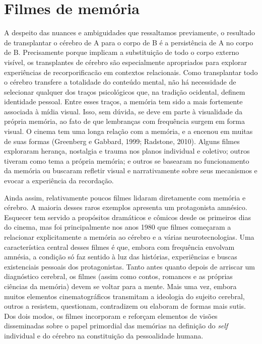 \section{Filmes de memória}

A despeito das nuances e ambiguidades que ressaltamos previamente, o
resultado de transplantar o cérebro de A para o corpo de B é a
persistência de A no corpo de B. Precisamente porque implicam a
substituição de todo o corpo externo visível, os transplantes de cérebro
são especialmente apropriados para explorar experiências de
recorporificacão em contextos relacionais. Como transplantar todo o
cérebro transfere a totalidade do conteúdo mental, não há necessidade de
selecionar qualquer dos traços psicológicos que, na tradição ocidental,
definem identidade pessoal. Entre esses traços, a memória tem sido a mais
fortemente associada à mídia visual. Isso, sem dúvida, se deve em parte
à visualidade da própria memória, ao fato de que lembranças com
frequência surgem em forma visual. O cinema tem uma longa relação com a
memória, e a encenou em muitas de suas formas (Greenberg e Gabbard,
1999; Radstone, 2010). Alguns filmes exploraram herança, nostalgia e
trauma nos planos individual e coletivo; outros tiveram como tema a
própria memória; e outros se basearam no funcionamento da memória ou
buscaram refletir visual e narrativamente sobre seus mecanismos e evocar
a experiência da recordação.

Ainda assim, relativamente poucos filmes lidaram diretamente com memória
e cérebro. A maioria desses raros exemplos apresenta um protagonista
amnésico. Esquecer tem servido a propósitos dramáticos e cômicos desde
os primeiros dias do cinema, mas foi principalmente nos anos 1980 que
filmes começaram a relacionar explicitamente a memória ao cérebro e a
várias neurotecnologias. Uma característica central desses filmes é que,
embora com frequência envolvam amnésia, a condição só faz sentido à luz
das histórias, experiências e buscas existenciais pessoais dos
protagonistas. Tanto antes quanto depois de arriscar um diagnóstico
cerebral, os filmes (assim como contos, romances e as próprias ciências
da memória) devem se voltar para a mente. Mais uma vez, embora muitos
elementos cinematográficos transmitam a ideologia do sujeito cerebral,
outros a resistem, questionam, contradizem ou elaboram de formas mais
sutis. Dos dois modos, os filmes incorporam e reforçam elementos de
visões disseminadas sobre o papel primordial das memórias na definição
do \emph{self} individual e do cérebro na constituição da pessoalidade humana.

